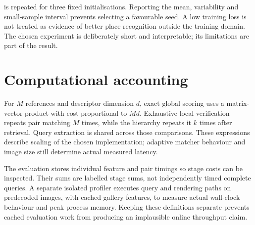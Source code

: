  is repeated for three fixed initialisations. Reporting the mean, variability and small-sample interval prevents selecting a favourable seed. A low training loss is not treated as evidence of better place recognition outside the training domain. The chosen experiment is deliberately short and interpretable; its limitations are part of the result.

\ifFullReport
\section{Computational accounting}
For $M$ references and descriptor dimension $d$, exact global scoring uses a matrix-vector product with cost proportional to $Md$. Exhaustive local verification repeats pair matching $M$ times, while the hierarchy repeats it $k$ times after retrieval. Query extraction is shared across those comparisons. These expressions describe scaling of the chosen implementation; adaptive matcher behaviour and image size still determine actual measured latency.

The evaluation stores individual feature and pair timings so stage costs can be inspected. Their sums are labelled stage sums, not independently timed complete queries. A separate isolated profiler executes query and rendering paths on predecoded images, with cached gallery features, to measure actual wall-clock behaviour and peak process memory. Keeping these definitions separate prevents cached evaluation work from producing an implausible online throughput claim.
\fi

